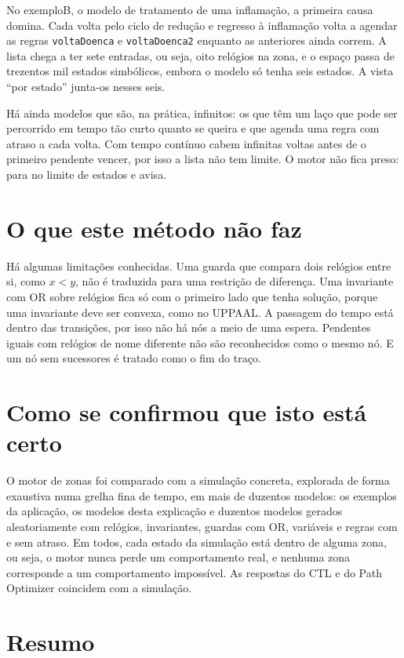 \documentclass[11pt,a4paper]{article}
\newcommand{\code}[1]{\texttt{#1}}
\begin{document}
No exemploB, o modelo de tratamento de uma inflamação, a primeira causa domina. Cada volta pelo ciclo de redução e regresso à inflamação volta a agendar as regras \code{voltaDoenca} e \code{voltaDoenca2} enquanto as anteriores ainda correm. A lista chega a ter sete entradas, ou seja, oito relógios na zona, e o espaço passa de trezentos mil estados simbólicos, embora o modelo só tenha seis estados. A vista ``por estado'' junta-os nesses seis.

Há ainda modelos que são, na prática, infinitos: os que têm um laço que pode ser percorrido em tempo tão curto quanto se queira e que agenda uma regra com atraso a cada volta. Com tempo contínuo cabem infinitas voltas antes de o primeiro pendente vencer, por isso a lista não tem limite. O motor não fica preso: para no limite de estados e avisa.

\section{O que este método não faz}

Há algumas limitações conhecidas. Uma guarda que compara dois relógios entre si, como \(x < y\), não é traduzida para uma restrição de diferença. Uma invariante com OR sobre relógios fica só com o primeiro lado que tenha solução, porque uma invariante deve ser convexa, como no UPPAAL. A passagem do tempo está dentro das transições, por isso não há nós a meio de uma espera. Pendentes iguais com relógios de nome diferente não são reconhecidos como o mesmo nó. E um nó sem sucessores é tratado como o fim do traço.

\section{Como se confirmou que isto está certo}

O motor de zonas foi comparado com a simulação concreta, explorada de forma exaustiva numa grelha fina de tempo, em mais de duzentos modelos: os exemplos da aplicação, os modelos desta explicação e duzentos modelos gerados aleatoriamente com relógios, invariantes, guardas com OR, variáveis e regras com e sem atraso. Em todos, cada estado da simulação está dentro de alguma zona, ou seja, o motor nunca perde um comportamento real, e nenhuma zona corresponde a um comportamento impossível. As respostas do CTL e do Path Optimizer coincidem com a simulação.

\section{Resumo}
\end{document}
